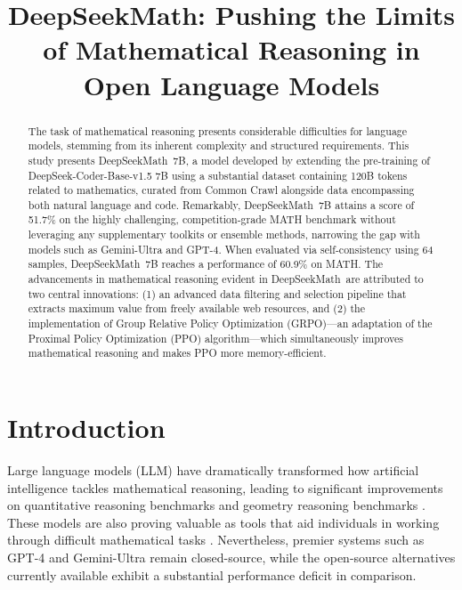 \title{DeepSeekMath: Pushing the Limits of Mathematical Reasoning in Open Language Models}

\begin{abstract}
The task of mathematical reasoning presents considerable difficulties for language models, stemming from its inherent complexity and structured requirements. This study presents DeepSeekMath~7B, a model developed by extending the pre-training of DeepSeek-Coder-Base-v1.5 7B using a substantial dataset containing 120B tokens related to mathematics, curated from Common Crawl alongside data encompassing both natural language and code. Remarkably, DeepSeekMath~7B attains a score of 51.7\% on the highly challenging, competition-grade MATH benchmark without leveraging any supplementary toolkits or ensemble methods, narrowing the gap with models such as Gemini-Ultra and GPT-4. When evaluated via self-consistency using 64 samples, DeepSeekMath~7B reaches a performance of 60.9\% on MATH. The advancements in mathematical reasoning evident in DeepSeekMath~are attributed to two central innovations: (1) an advanced data filtering and selection pipeline that extracts maximum value from freely available web resources, and (2) the implementation of Group Relative Policy Optimization (GRPO)—an adaptation of the Proximal Policy Optimization (PPO) algorithm—which simultaneously improves mathematical reasoning and makes PPO more memory-efficient.
\end{abstract}

\section{Introduction}

Large language models (LLM) have dramatically transformed how artificial intelligence tackles mathematical reasoning, leading to significant improvements on quantitative reasoning benchmarks \citep{MATH} and geometry reasoning benchmarks \citep{trinh2024solving}. These models are also proving valuable as tools that aid individuals in working through difficult mathematical tasks \citep{tao}. Nevertheless, premier systems such as GPT-4 \citep{gpt4} and Gemini-Ultra \citep{gemini} remain closed-source, while the open-source alternatives currently available exhibit a substantial performance deficit in comparison.

